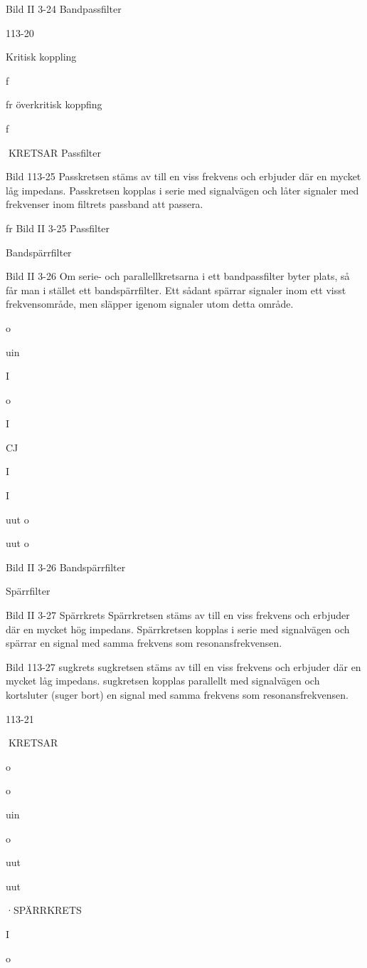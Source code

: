 \documentclass[a4paper,twoside,twocolumn,openright]{book}
\begin{document}
{{{{{{{Bild II 3-24 Bandpassfilter

113-20

Kritisk koppling

f

fr
överkritisk koppfing

f

KRETSAR
Passfilter

Bild 113-25
Passkretsen stäms av till en viss frekvens
och erbjuder där en mycket låg impedans.
Passkretsen kopplas i serie med signalvägen och låter signaler med frekvenser inom
filtrets passband att passera.

fr
Bild II 3-25 Passfilter

Bandspärrfilter

Bild II 3-26
Om serie- och parallellkretsarna i ett bandpassfilter byter plats, så får man i stället ett
bandspärrfilter. Ett sådant spärrar signaler
inom ett visst frekvensområde, men släpper
igenom signaler utom detta område.

o

uin

I

o

I

CJ

I

I

uut
o

uut
o

Bild II 3-26 Bandspärrfilter

Spärrfilter

Bild II 3-27
Spärrkrets
Spärrkretsen stäms av till en viss frekvens
och erbjuder där en mycket hög impedans.
Spärrkretsen kopplas i serie med signalvägen och spärrar en signal med samma
frekvens som resonansfrekvensen.

Bild 113-27
sugkrets
sugkretsen stäms av till en viss frekvens och
erbjuder där en mycket låg impedans. sugkretsen kopplas parallellt med signalvägen
och kortsluter (suger bort) en signal med
samma frekvens som resonansfrekvensen.

113-21

KRETSAR

o

o

uin

o

uut

uut

·SPÄRRKRETS

I

o

}}}}}}}
\end{document}
